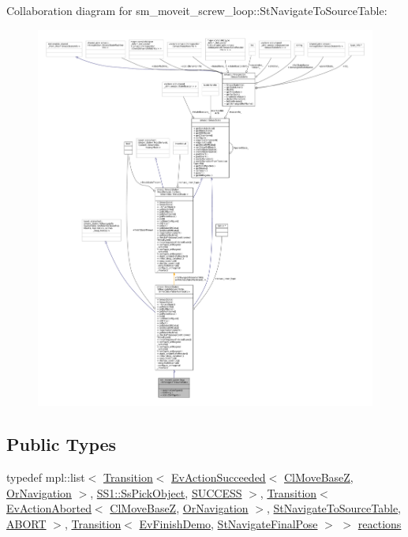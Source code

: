 Collaboration diagram for sm\+\_\+moveit\+\_\+screw\+\_\+loop\+:\+:St\+Navigate\+To\+Source\+Table\+:
\nopagebreak
\begin{figure}[H]
\begin{center}
\leavevmode
\includegraphics[width=350pt]{structsm__moveit__screw__loop_1_1StNavigateToSourceTable__coll__graph}
\end{center}
\end{figure}
\subsection*{Public Types}
\begin{DoxyCompactItemize}
\item 
typedef mpl\+::list$<$ \hyperlink{classsmacc_1_1Transition}{Transition}$<$ \hyperlink{structsmacc_1_1default__events_1_1EvActionSucceeded}{Ev\+Action\+Succeeded}$<$ \hyperlink{classcl__move__base__z_1_1ClMoveBaseZ}{Cl\+Move\+BaseZ}, \hyperlink{classsm__moveit__screw__loop_1_1OrNavigation}{Or\+Navigation} $>$, \hyperlink{structsm__moveit__screw__loop_1_1SS1_1_1SsPickObject}{S\+S1\+::\+Ss\+Pick\+Object}, \hyperlink{structsmacc_1_1default__transition__tags_1_1SUCCESS}{S\+U\+C\+C\+E\+SS} $>$, \hyperlink{classsmacc_1_1Transition}{Transition}$<$ \hyperlink{structsmacc_1_1default__events_1_1EvActionAborted}{Ev\+Action\+Aborted}$<$ \hyperlink{classcl__move__base__z_1_1ClMoveBaseZ}{Cl\+Move\+BaseZ}, \hyperlink{classsm__moveit__screw__loop_1_1OrNavigation}{Or\+Navigation} $>$, \hyperlink{structsm__moveit__screw__loop_1_1StNavigateToSourceTable}{St\+Navigate\+To\+Source\+Table}, \hyperlink{structsmacc_1_1default__transition__tags_1_1ABORT}{A\+B\+O\+RT} $>$, \hyperlink{classsmacc_1_1Transition}{Transition}$<$ \hyperlink{structsm__moveit__screw__loop_1_1EvFinishDemo}{Ev\+Finish\+Demo}, \hyperlink{structsm__moveit__screw__loop_1_1StNavigateFinalPose}{St\+Navigate\+Final\+Pose} $>$ $>$ \hyperlink{structsm__moveit__screw__loop_1_1StNavigateToSourceTable_a8c117a31115b8037ce188be9e98134d1}{reactions}
\end{DoxyCompactItemize}
